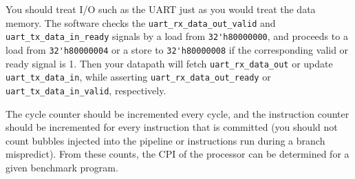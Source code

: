 You should treat I/O such as the UART just as you would treat the data memory.
The software checks the \verb|uart_rx_data_out_valid| and \verb|uart_tx_data_in_ready| signals by a load from \verb|32'h80000000|, and proceeds to a load from \verb|32'h80000004| or a store to \verb|32'h80000008| if the corresponding valid or ready signal is 1. Then your datapath will fetch \verb|uart_rx_data_out| or update \verb|uart_tx_data_in|, while asserting \verb|uart_rx_data_out_ready| or \verb|uart_tx_data_in_valid|, respectively.

The cycle counter should be incremented every cycle, and the instruction counter should be incremented for every instruction that is committed (you should not count bubbles injected into the pipeline or instructions run during a branch mispredict).
From these counts, the CPI of the processor can be determined for a given benchmark program.

\newpage
